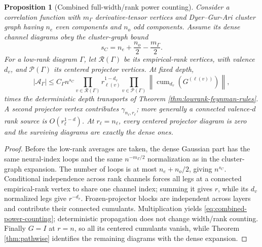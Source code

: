 \documentclass{article}
\newtheorem{proposition}[theorem]{Proposition}
\newcommand{\cumul}{\operatorname{cum}}
\begin{document}
\begin{proposition}[Combined full-width/rank power counting]
\label{prop:combined-power-counting}
Consider a correlation function with \(m_\Gamma\) derivative-tensor vertices and Dyer--Gur-Ari cluster graph having \(n_e\) even components and \(n_o\) odd components.  Assume its dense channel diagrams obey the cluster-graph bound
\begin{equation}
s_C=n_e+\frac{n_o}{2}-\frac{m_\Gamma}{2}.
\label{eq:dyer-cluster-exponent}
\end{equation}
For a low-rank diagram \(\Gamma\), let \(\mathcal R(\Gamma)\) be its empirical-rank vertices, with valence \(d_v\), and \(\mathcal P(\Gamma)\) its centered projector vertices.  At fixed depth,
\begin{equation}
|\mathcal A_\Gamma|
\le C_\Gamma n^{s_C}
\prod_{v\in\mathcal R(\Gamma)}r_{\ell(v)}^{1-d_v}
\prod_{v\in\mathcal P(\Gamma)}
\left\|\cumul_{d_v}(G^{(\ell(v))})\right\|,
\label{eq:combined-power-counting}
\end{equation}
times the deterministic depth transports of Theorem \ref{thm:lowrank-feynman-rules}.  A second projector vertex contributes \(\gamma_{n_\ell,r_\ell}\); more generally a connected valence-\(d\) rank source is \(O(r_\ell^{1-d})\).  At \(r_\ell=n_\ell\), every centered projector diagram is zero and the surviving diagrams are exactly the dense ones.
\end{proposition}

\begin{proof}
Before the low-rank averages are taken, the dense Gaussian part has the same neural-index loops and the same \(n^{-m_\Gamma/2}\) normalization as in the cluster-graph expansion.  The number of loops is at most \(n_e+n_o/2\), giving \(n^{s_C}\).  Conditional independence across rank channels forces all legs at a connected empirical-rank vertex to share one channel index; summing it gives \(r\), while its \(d_v\) normalized legs give \(r^{-d_v}\).  Frozen-projector blocks are independent across layers and contribute their connected cumulants.  Multiplication yields \eqref{eq:combined-power-counting}; deterministic propagation does not change width/rank counting.  Finally \(G=I\) at \(r=n\), so all its centered cumulants vanish, while Theorem \ref{thm:pathwise} identifies the remaining diagrams with the dense expansion.
\end{proof}
\end{document}
